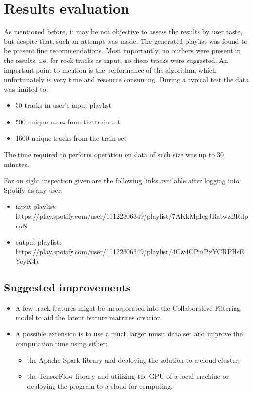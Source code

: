 \documentclass{article}
\numberwithin{equation}{section}		%
\numberwithin{figure}{section}			%
\numberwithin{table}{section}				%
\begin{document}
\section{Results evaluation}
As mentioned before, it may be not objective to assess the results by user taste, but despite that, such an attempt was made.
The generated playlist was found to be present fine recommendations. Most importantly, no outliers were present in the results, i.e. for rock tracks as input, no disco tracks were suggested.
An important point to mention is the performance of the algorithm, which unfortunately is very time and resource consuming. During a typical test the data was limited to:
\begin{itemize}
\item 50 tracks in user's input playlist
\item 500 unique users from the train set
\item 1600 unique tracks from the train set
\end{itemize}
The time required to perform operation on data of such size was up to 30 minutes.

For on sight inspection given are the following links available after logging into Spotify as any user:
\begin{itemize}
\item input playlist:
https://play.spotify.com/user/11122306349/playlist/7AKkMpIegJRatwzBRdpnaN

\item output playlist:
https://play.spotify.com/user/11122306349/playlist/4Cw4CPmPxYCRPHsEYcyK4a
\end{itemize}


\subsection{Suggested improvements}
\begin{itemize}
\item A few track features might be incorporated into the Collaborative Filtering model to aid the latent feature matrices creation.
\item A possible extension is to use a much larger music data set and improve the computation time using either:
\begin{itemize}
	\item the Apache Spark library and deploying the solution to a cloud cluster;
	\item the TensorFlow\cite{MatrixFactWithTensorFL} library and utilizing the GPU of a local machine or deploying the program to a cloud for computing.
\end{itemize}
\end{itemize}
\end{document}
